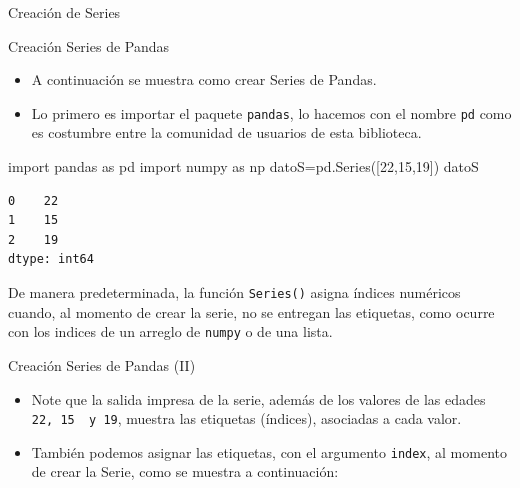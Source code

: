\documentclass[
  ignorenonframetext,
  aspectratio=169,
  spanish,
]{beamer}
\newenvironment{Shaded}{\begin{snugshade}}{\end{snugshade}}
\newcommand{\DecValTok}[1]{\textcolor[rgb]{0.68,0.00,0.00}{#1}}
\newcommand{\ImportTok}[1]{\textcolor[rgb]{0.00,0.46,0.62}{#1}}
\newcommand{\NormalTok}[1]{\textcolor[rgb]{0.00,0.23,0.31}{#1}}
\newcommand{\OperatorTok}[1]{\textcolor[rgb]{0.37,0.37,0.37}{#1}}
\begin{document}
\begin{frame}[fragile]{Creación de Series}
\label{creaciuxf3n-de-series}
\begin{block}{Creación Series de Pandas}
\label{creaciuxf3n-series-de-pandas}
 

\begin{itemize}
\item
  A continuación se muestra como crear Series de Pandas.
\item
  Lo primero es importar el paquete \texttt{pandas}, lo hacemos con el
  nombre \texttt{pd} como es costumbre entre la comunidad de usuarios de
  esta biblioteca.
\end{itemize}

\begin{Shaded}
\begin{Highlighting}[]
\ImportTok{import}\NormalTok{ pandas }\ImportTok{as}\NormalTok{ pd}
\ImportTok{import}\NormalTok{ numpy }\ImportTok{as}\NormalTok{ np }
\NormalTok{datoS}\OperatorTok{=}\NormalTok{pd.Series([}\DecValTok{22}\NormalTok{,}\DecValTok{15}\NormalTok{,}\DecValTok{19}\NormalTok{]) }
\NormalTok{datoS}
\end{Highlighting}
\end{Shaded}

\begin{verbatim}
0    22
1    15
2    19
dtype: int64
\end{verbatim}

De manera predeterminada, la función \texttt{Series()} asigna índices
numéricos cuando, al momento de crear la serie, no se entregan las
etiquetas, como ocurre con los indices de un arreglo de \texttt{numpy} o
de una lista.
\end{block}

\begin{block}{Creación Series de Pandas (II)}
\label{creaciuxf3n-series-de-pandas-ii}
\begin{itemize}
\item
  Note que la salida impresa de la serie, además de los valores de las
  edades \texttt{22,\ 15\ \ y\ 19}, muestra las etiquetas (índices),
  asociadas a cada valor.
\item
  También podemos asignar las etiquetas, con el argumento
  \texttt{index}, al momento de crear la Serie, como se muestra a
  continuación:
\end{itemize}


\end{block}
\end{frame}
\end{document}
